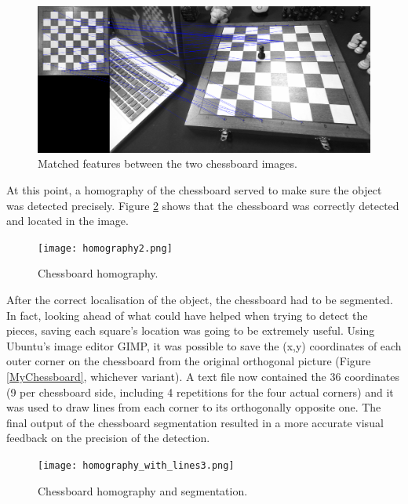 \documentclass{l4proj}
\begin{document}
\vspace{5mm}
\begin{figure}[h!]
\centering
\includegraphics[scale=0.25]{matched_features.png}
\caption{Matched features between the two chessboard images.}
\label{matched_features}
\end{figure}

At this point, a homography of the chessboard served to make sure the object was detected precisely. Figure \ref{homography} shows that the chessboard was correctly detected and located in the image.

\vspace{5mm}
\begin{figure}[h!]
\centering
\texttt{[image: homography2.png]}
\caption{Chessboard homography.}
\label{homography}
\end{figure}

After the correct localisation of the object, the chessboard had to be segmented. In fact, looking ahead of what could have helped when trying to detect the pieces, saving each square's location was going to be extremely useful. Using Ubuntu's image editor GIMP, it was possible to save the (x,y) coordinates of each outer corner on the chessboard from the original orthogonal picture (Figure \ref{MyChessboard}, whichever variant). A text file now contained the 36 coordinates (9 per chessboard side, including 4 repetitions for the four actual corners) and it was used to draw lines from each corner to its orthogonally opposite one. The final output of the chessboard segmentation resulted in a more accurate visual feedback on the precision of the detection.

\vspace{5mm}
\begin{figure}[h!]
\centering
\texttt{[image: homography\_with\_lines3.png]}
\caption{Chessboard homography and segmentation.}
\label{homographyAndSegmentation}
\end{figure}
\end{document}
